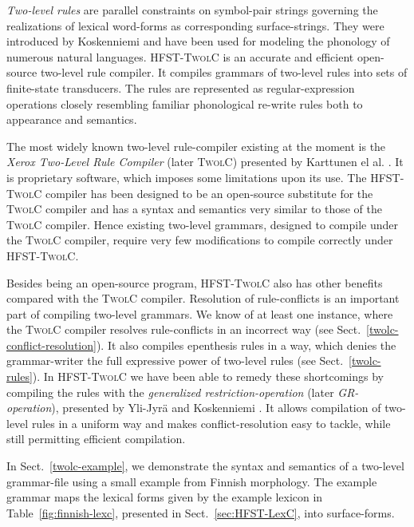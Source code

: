 \documentclass[a4paper]{article}
\begin{document}
\textit{Two-level rules} are parallel constraints on symbol-pair
strings governing the realizations of lexical word-forms as
corresponding surface-strings. They were introduced by Koskenniemi
\cite{Koskenniemi83} and have been used for modeling the phonology of
numerous natural languages. \textsc{HFST-TwolC} is an accurate and
efficient open-source two-level rule compiler. It compiles grammars of
two-level rules into sets of finite-state transducers. The rules are
represented as regular-expression operations closely resembling
familiar phonological re-write rules both to appearance and semantics.

The most widely known two-level rule-compiler existing at the moment
is the \emph{Xerox Two-Level Rule Compiler} (later \textsc{TwolC})
presented by Karttunen el al. \cite{Karttunen92}.  It is proprietary
software, which imposes some limitations upon its use. The
\textsc{HFST-TwolC} compiler has been designed to be an open-source
substitute for the \textsc{TwolC} compiler and has a syntax and
semantics very similar to those of the \textsc{TwolC} compiler. Hence
existing two-level grammars, designed to compile under the
\textsc{TwolC} compiler, require very few modifications to compile
correctly under \textsc{HFST-TwolC}.

Besides being an open-source program, \textsc{HFST-TwolC} also has
other benefits compared with the \textsc{TwolC} compiler. Resolution
of rule-conflicts is an important part of compiling two-level
grammars. We know of at least one instance, where the \textsc{TwolC}
compiler resolves rule-conflicts in an incorrect way (see
Sect.~\ref{twolc-conflict-resolution}). It also compiles epenthesis
rules in a way, which denies the grammar-writer the full expressive
power of two-level rules (see Sect.~\ref{twolc-rules}). In
\textsc{HFST-TwolC} we have been able to remedy these shortcomings by
compiling the rules with the \textit{generalized
restriction-operation} (later \textit{GR-operation}), presented by
Yli-Jyr\"a and Koskenniemi \cite{Yli-Jyra06}. It allows compilation of
two-level rules in a uniform way and makes conflict-resolution easy to
tackle, while still permitting efficient compilation.

In Sect.~\ref{twolc-example}, we demonstrate the syntax and semantics
of a two-level grammar-file using a small example from Finnish
morphology. The example grammar maps the lexical forms given by the
example lexicon in Table~\ref{fig:finnish-lexc}, presented in
Sect.~\ref{sec:HFST-LexC}, into surface-forms.
\end{document}
